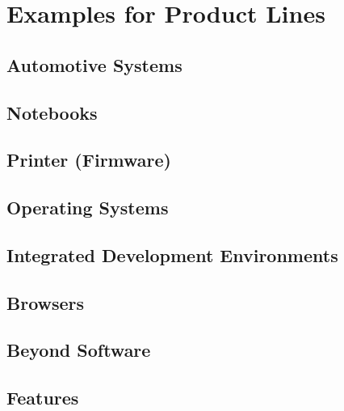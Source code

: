 \documentclass[
	aspectratio=169, %
	8pt, %
	handout, %
]{beamer}
\subtitle{1. Introduction}
\author{Thomas Thüm}
\begin{document}


\section{Examples for Product Lines}

\subsection{Automotive Systems}
\subsection{Notebooks}
\subsection{Printer (Firmware)}
\subsection{Operating Systems}
\subsection{Integrated Development Environments}
\subsection{Browsers}
\subsection{Beyond Software}




\subsection{Features}
\end{document}
